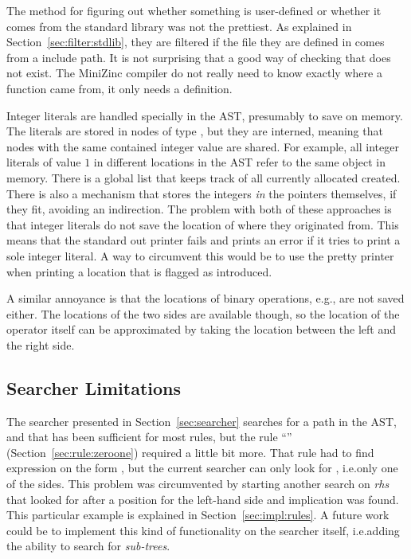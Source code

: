 \documentclass[a4paper,12pt]{article}
\newcommand{\ruleref}[1]{``\nameref{sec:rule:#1}'' (Section~\ref{sec:rule:#1})}
\begin{document}
The method for figuring out whether something is user-defined or whether it comes from the
standard library was not the prettiest. As explained in Section~\ref{sec:filter:stdlib},
they are filtered if the file they are defined in comes from a include path. It is not
surprising that a good way of checking that does not exist. The MiniZinc compiler do not
really need to know exactly where a function came from, it only needs a definition.

Integer literals are handled specially in the AST, presumably to save on memory. The
literals are stored in nodes of type , but they are interned, meaning that
nodes with the same contained integer value are shared. For example, all integer literals
of value $1$ in different locations in the AST refer to the same object in memory. There
is a global list that keeps track of all currently allocated  created. There is
also a mechanism that stores the integers \emph{in} the pointers themselves, if they fit,
avoiding an indirection. The problem with both of these approaches is that integer
literals do not save the location of where they originated from. This means that the
standard out printer fails and prints an error if it tries to print a sole integer
literal. A way to circumvent this would be to use the pretty printer when printing a
location that is flagged as introduced.

A similar annoyance is that the locations of binary operations, e.g.\@ \mi{/\\}, are not
saved either. The locations of the two sides are available though, so the location of the
operator itself can be approximated by taking the location between the left and the right
side.

\subsection{Searcher Limitations}
The searcher presented in Section~\ref{sec:searcher} searches for a path in the AST, and that
has been sufficient for most rules, but the rule \ruleref{zeroone} required a little bit
more. That rule had to find expression on the form , but the current
searcher can only look for , i.e.\@ only one of the sides. This problem was
circumvented by starting another search on \textit{rhs} that looked for  after a
position for the left-hand side and implication was found. This particular example is
explained in Section~\ref{sec:impl:rules}. A future work could be to
implement this kind of functionality on the searcher itself, i.e.\@ adding the
ability to search for \emph{sub-trees}.
\end{document}
